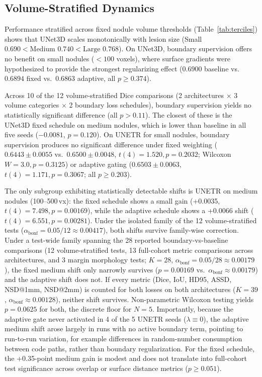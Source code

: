 \documentclass[10pt, a4paper, twocolumn]{article}
\begin{document}
\subsection{Volume-Stratified Dynamics}
Performance stratified across fixed nodule volume thresholds (Table~\ref{tab:terciles}) shows that UNet3D scales monotonically with lesion size (Small $0.690 < \text{Medium } 0.740 < \text{Large } 0.768$). On UNet3D, boundary supervision offers no benefit on small nodules ($<100$ voxels), where surface gradients were hypothesized to provide the strongest regularizing effect ($0.6900$ baseline vs.\ $0.6894$ fixed vs.\ $0.6863$ adaptive, all $p \ge 0.374$). 

Across 10 of the 12 volume-stratified Dice comparisons (2 architectures $\times$ 3 volume categories $\times$ 2 boundary loss schedules), boundary supervision yields no statistically significant difference (all $p > 0.11$). The closest of these is the UNet3D fixed schedule on medium nodules, which is lower than baseline in all five seeds ($-0.0081$, $p=0.120$). On UNETR for small nodules, boundary supervision produces no significant difference under fixed weighting ($0.6443 \pm 0.0055$ vs.\ $0.6500 \pm 0.0048$, $t(4) = 1.520, p = 0.2032$; Wilcoxon $W = 3.0, p = 0.3125$) or adaptive gating ($0.6503 \pm 0.0063$, $t(4) = 1.171, p = 0.3067$; all $p \ge 0.203$).

The only subgroup exhibiting statistically detectable shifts is UNETR on medium nodules (100--500\,vx): the fixed schedule shows a small gain (+0.0035, $t(4) = 7.498, p = 0.00169$), while the adaptive schedule shows a +0.0066 shift ($t(4) = 6.551, p = 0.00281$). Under the isolated family of the 12 volume-stratified tests ($\alpha_{\text{bonf}} = 0.05 / 12 \approx 0.00417$), both shifts survive family-wise correction. Under a test-wide family spanning the 28 reported boundary-vs-baseline comparisons (12 volume-stratified tests, 13 full-cohort metric comparisons across architectures, and 3 margin morphology tests; $K=28$, $\alpha_{\text{bonf}} = 0.05 / 28 \approx 0.00179$), the fixed medium shift only narrowly survives ($p = 0.00169$ vs.\ $\alpha_{\text{bonf}} \approx 0.00179$) and the adaptive shift does not. If every metric (Dice, IoU, HD95, ASSD, NSD@1mm, NSD@2mm) is counted for both losses on both architectures ($K=39$, $\alpha_{\text{bonf}} \approx 0.00128$), neither shift survives. Non-parametric Wilcoxon testing yields $p = 0.0625$ for both, the discrete floor for $N=5$. Importantly, because the adaptive gate never activated in 4 of the 5 UNETR seeds ($\lambda \equiv 0$), the adaptive medium shift arose largely in runs with no active boundary term, pointing to run-to-run variation, for example differences in random-number consumption between code paths, rather than boundary regularization. For the fixed schedule, the +0.35-point medium gain is modest and does not translate into full-cohort test significance across overlap or surface distance metrics ($p \ge 0.051$).
\end{document}
